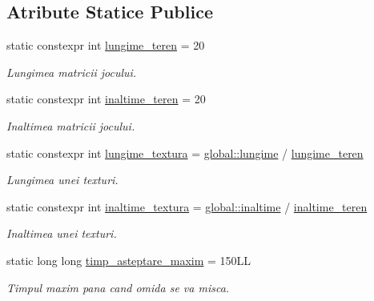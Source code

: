 \subsection*{Atribute Statice Publice}
\begin{DoxyCompactItemize}
\item 
\mbox{\label{classStadiulJocului_ab1b866a96905e3491008c1e7268d9983}} 
static constexpr int \hyperlink{classStadiulJocului_ab1b866a96905e3491008c1e7268d9983}{lungime\+\_\+teren} = 20
\begin{DoxyCompactList}\small\item\em Lungimea matricii jocului. \end{DoxyCompactList}\item 
\mbox{\label{classStadiulJocului_a19203356f61f0f11191445347092bd3c}} 
static constexpr int \hyperlink{classStadiulJocului_a19203356f61f0f11191445347092bd3c}{inaltime\+\_\+teren} = 20
\begin{DoxyCompactList}\small\item\em Inaltimea matricii jocului. \end{DoxyCompactList}\item 
static constexpr int \hyperlink{classStadiulJocului_ad66a6d4dd8dcbebe7df6098696f205a5}{lungime\+\_\+textura} = \hyperlink{namespaceglobal_a5ad71f80dc82eb6fd1036c8055a5dfbc}{global\+::lungime} / \hyperlink{classStadiulJocului_ab1b866a96905e3491008c1e7268d9983}{lungime\+\_\+teren}
\begin{DoxyCompactList}\small\item\em Lungimea unei texturi. \end{DoxyCompactList}\item 
\mbox{\label{classStadiulJocului_a59c1dd4044856f47e36291c474f99040}} 
static constexpr int \hyperlink{classStadiulJocului_a59c1dd4044856f47e36291c474f99040}{inaltime\+\_\+textura} = \hyperlink{namespaceglobal_a612e7b296f148c02400618f1770f57f7}{global\+::inaltime} / \hyperlink{classStadiulJocului_a19203356f61f0f11191445347092bd3c}{inaltime\+\_\+teren}
\begin{DoxyCompactList}\small\item\em Inaltimea unei texturi. \end{DoxyCompactList}\item 
\mbox{\label{classStadiulJocului_a4cdf9582b472e74980e1eee73ca94769}} 
static long long \hyperlink{classStadiulJocului_a4cdf9582b472e74980e1eee73ca94769}{timp\+\_\+asteptare\+\_\+maxim} = 150\+LL
\begin{DoxyCompactList}\small\item\em Timpul maxim pana cand omida se va misca. \end{DoxyCompactList}\end{DoxyCompactItemize}


